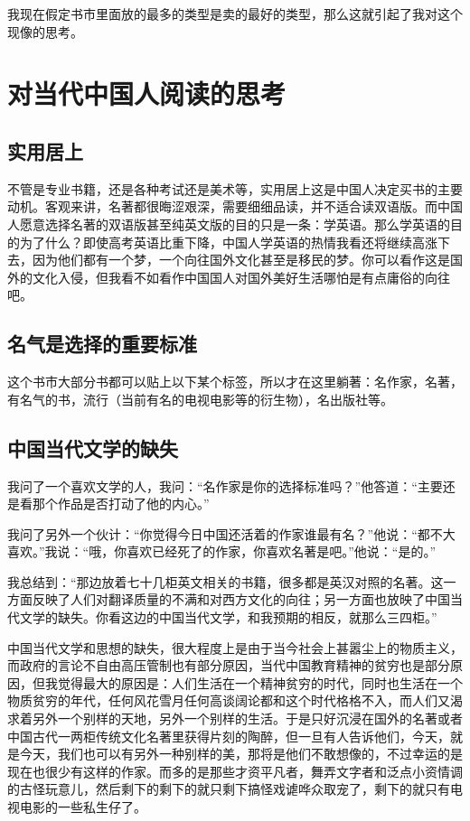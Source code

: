 \documentclass[11pt,oneside]{article}
\begin{document}
\begin{common-format}
我现在假定书市里面放的最多的类型是卖的最好的类型，那么这就引起了我对这个现像的思考。


\section{对当代中国人阅读的思考}

\subsection{实用居上}
不管是专业书籍，还是各种考试还是美术等，实用居上这是中国人决定买书的主要动机。客观来讲，名著都很晦涩艰深，需要细细品读，并不适合读双语版。而中国人愿意选择名著的双语版甚至纯英文版的目的只是一条：学英语。那么学英语的目的为了什么？即使高考英语比重下降，中国人学英语的热情我看还将继续高涨下去，因为他们都有一个梦，一个向往国外文化甚至是移民的梦。你可以看作这是国外的文化入侵，但我看不如看作中国国人对国外美好生活哪怕是有点庸俗的向往吧。

\subsection{名气是选择的重要标准}
这个书市大部分书都可以贴上以下某个标签，所以才在这里躺著：名作家，名著，有名气的书，流行（当前有名的电视电影等的衍生物），名出版社等。

\subsection{中国当代文学的缺失}
我问了一个喜欢文学的人，我问：“名作家是你的选择标准吗？”他答道：“主要还是看那个作品是否打动了他的内心。”

我问了另外一个伙计：“你觉得今日中国还活着的作家谁最有名？”他说：“都不大喜欢。”我说：“哦，你喜欢已经死了的作家，你喜欢名著是吧。”他说：“是的。”

我总结到：“那边放着七十几柜英文相关的书籍，很多都是英汉对照的名著。这一方面反映了人们对翻译质量的不满和对西方文化的向往；另一方面也放映了中国当代文学的缺失。你看这边的中国当代文学，和我预期的相反，就那么三四柜。”

中国当代文学和思想的缺失，很大程度上是由于当今社会上甚嚣尘上的物质主义，而政府的言论不自由高压管制也有部分原因，当代中国教育精神的贫穷也是部分原因，但我觉得最大的原因是：人们生活在一个精神贫穷的时代，同时也生活在一个物质贫穷的年代，任何风花雪月任何高谈阔论都和这个时代格格不入，而人们又渴求着另外一个别样的天地，另外一个别样的生活。于是只好沉浸在国外的名著或者中国古代一两柜传统文化名著里获得片刻的陶醉，但一旦有人告诉他们，今天，就是今天，我们也可以有另外一种别样的美，那将是他们不敢想像的，不过幸运的是现在也很少有这样的作家。而多的是那些才资平凡者，舞弄文字者和泛点小资情调的古怪玩意儿，然后剩下的剩下的就只剩下搞怪戏谑哗众取宠了，剩下的就只有电视电影的一些私生仔了。


\end{common-format}
\end{document}
